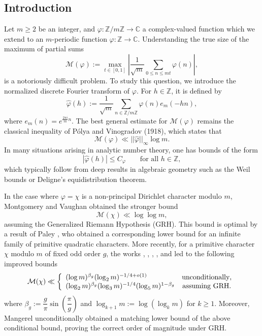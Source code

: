 \documentclass[12pt]{amsart}
\theoremstyle{definition}
\numberwithin{equation}{section}
\numberwithin{equation}{section}
\def\C{\mathbb{C}}
\def\Z{\mathbb{Z}}
\def\M{\mathcal{M}}
\def\Mp{C_\varphi}
\begin{document}
\subsection{Introduction}
Let $m\geq 2$ be an integer, and $\varphi:\Z/m\Z\to \C$ a complex-valued function which we extend to an $m$-periodic function $\varphi:\Z\to \C$.   
Understanding the true size of the maximum of partial sums 
\[\M(\varphi) := 
\max_{t\in[0,1]}\left|
\frac{1}{\sqrt{m}}\sum_{0\leq n\leq mt} \varphi(n)
\right|,
\] is a notoriously difficult problem.
To study this question, we introduce the normalized discrete Fourier transform of $\varphi$.
For $h\in\Z$, it is defined by
\[
\widehat{\varphi}(h):= \frac{1}{\sqrt{m}}\sum_{n\in \Z/m\Z} \varphi(n)e_m(-hn),
\]
where $e_m(n) = e^{\frac{2\pi i}{m}n}$. The best general estimate for $\M(\varphi)$ remains the classical inequality of Pólya and Vinogradov (1918), which states that
\[
\M(\varphi) \ll ||\widehat{\varphi}||_\infty \log m .
\] 
In many situations arising in analytic number theory, one has bounds of the form
\[
|\widehat{\varphi}(h)|\leq \Mp \qquad \text{for all } h\in\Z,
\]
which typically follow from deep results in algebraic geometry such as the Weil bounds or Deligne’s equidistribution theorem.


In the case where $\varphi =\chi$ is a non-principal Dirichlet character modulo $m$, Montgomery and Vaughan \cite{MV77} obtained the stronger bound
\[
\M(\chi )\ll \log\log m,\] assuming the Generalized Riemann Hypothesis (GRH).
This bound is optimal by a result of Paley \cite{P32}, who obtained a corresponding lower bound for an infinite family of primitive quadratic characters.
More recently, for a primitive character $\chi$ modulo $m$ of fixed odd order $g$, the works \cite{GS07}, \cite{Gol12}, \cite{GL12}, \cite{LM22}, and \cite{Man26} led to the following improved bounds
\[
\M(\chi )
\ll 
\left\{
\begin{array}{l cc l}
         (\log m)^{\beta_g} (\log_2 m)^{-1/4+o(1)}& \text{unconditionally},\\
     (\log_2 m)^{\beta_g}
(\log_3 m)^{-1/4}
(\log_5 m)^{1-\beta_g} & \text{assuming GRH}. 
\end{array}
\right.
\]
where $\beta_g := \dfrac{g}{\pi}\sin\left(\dfrac{\pi}{g}\right)$ and
$\log_{k+1} m := \log(\log_k m)$ for $k\geq 1$.
Moreover, Mangerel \cite{Man26} unconditionally obtained a matching lower bound of the above conditional bound, proving the correct order of magnitude under GRH.
\end{document}
